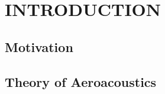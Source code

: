 %
%
%
%
%
%
%
%
%
%


%
%

\chapter{INTRODUCTION}

\section{Motivation}


\section{Theory of Aeroacoustics}

%

